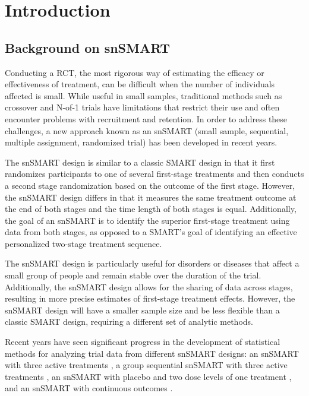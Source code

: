 \chapter{Introduction}
\label{chpt:introduction}

\section{Background on snSMART}
Conducting a \ac{RCT}, the most rigorous way of
estimating the efficacy or effectiveness of treatment, can be difficult when the number of individuals affected is small. While useful in small samples, traditional methods such as crossover and N-of-1 trials have limitations that restrict their use and often encounter problems with recruitment and retention. In order to address these challenges, a new approach known as an \ac{snSMART} (small sample, sequential, multiple assignment, randomized trial) has been developed in recent years.

The \ac{snSMART} design is similar to a classic \ac{SMART} design in that it first randomizes participants to one of several first-stage treatments and then conducts a second stage randomization based on the outcome of the first stage. However, the \ac{snSMART} design differs in that it measures the same treatment outcome at the end of both stages and the time length of both stages is equal. Additionally, the goal of an \ac{snSMART} is to identify the superior first-stage treatment using data from both stages, as opposed to a SMART's goal of identifying an effective personalized two-stage treatment sequence.

The \ac{snSMART} design is particularly useful for disorders or diseases that affect a small group of people and remain stable over the duration of the trial. Additionally, the \ac{snSMART} design allows for the sharing of data across stages, resulting in more precise estimates of first-stage treatment effects. However, the \ac{snSMART} design will have a smaller sample size and be less flexible than a classic SMART design, requiring a different set of analytic methods.

Recent years have seen significant progress in the development of statistical methods for analyzing trial data from different \ac{snSMART} designs: an \ac{snSMART} with three active treatments \citep{wei2018bayesian, wei2020sample, chao2020dynamic}, a group sequential \ac{snSMART} with three active treatments \citep{chao2020bayesian}, an \ac{snSMART} with placebo and two dose levels of one treatment \citep{fang2021bayesian, fang2023comparing}, and an \ac{snSMART} with continuous outcomes \citep{hartman2021design}.

